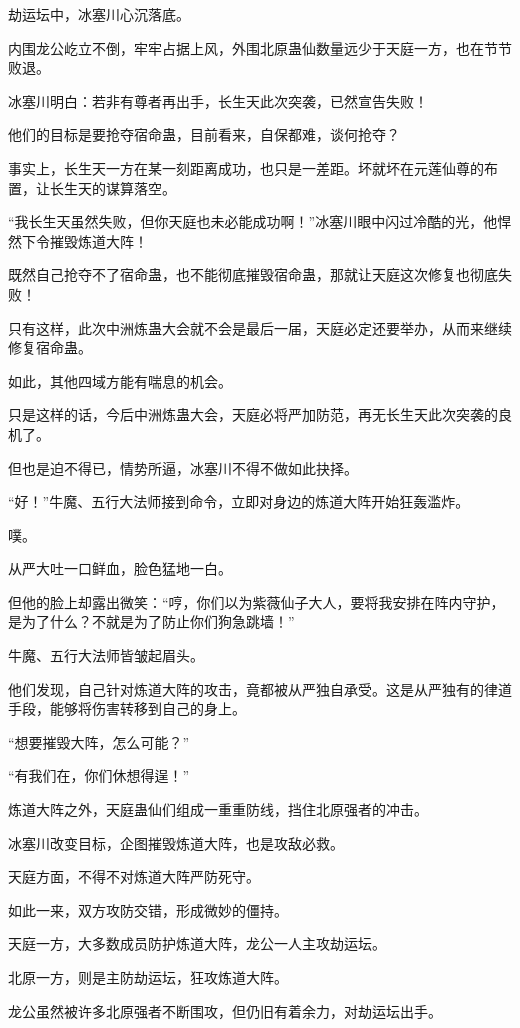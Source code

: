 \begin{this_body}
劫运坛中，冰塞川心沉落底。

内围龙公屹立不倒，牢牢占据上风，外围北原蛊仙数量远少于天庭一方，也在节节败退。

冰塞川明白：若非有尊者再出手，长生天此次突袭，已然宣告失败！

他们的目标是要抢夺宿命蛊，目前看来，自保都难，谈何抢夺？

事实上，长生天一方在某一刻距离成功，也只是一差距。坏就坏在元莲仙尊的布置，让长生天的谋算落空。

“我长生天虽然失败，但你天庭也未必能成功啊！”冰塞川眼中闪过冷酷的光，他悍然下令摧毁炼道大阵！

既然自己抢夺不了宿命蛊，也不能彻底摧毁宿命蛊，那就让天庭这次修复也彻底失败！

只有这样，此次中洲炼蛊大会就不会是最后一届，天庭必定还要举办，从而来继续修复宿命蛊。

如此，其他四域方能有喘息的机会。

只是这样的话，今后中洲炼蛊大会，天庭必将严加防范，再无长生天此次突袭的良机了。

但也是迫不得已，情势所逼，冰塞川不得不做如此抉择。

“好！”牛魔、五行大法师接到命令，立即对身边的炼道大阵开始狂轰滥炸。

噗。

从严大吐一口鲜血，脸色猛地一白。

但他的脸上却露出微笑：“哼，你们以为紫薇仙子大人，要将我安排在阵内守护，是为了什么？不就是为了防止你们狗急跳墙！”

牛魔、五行大法师皆皱起眉头。

他们发现，自己针对炼道大阵的攻击，竟都被从严独自承受。这是从严独有的律道手段，能够将伤害转移到自己的身上。

“想要摧毁大阵，怎么可能？”

“有我们在，你们休想得逞！”

炼道大阵之外，天庭蛊仙们组成一重重防线，挡住北原强者的冲击。

冰塞川改变目标，企图摧毁炼道大阵，也是攻敌必救。

天庭方面，不得不对炼道大阵严防死守。

如此一来，双方攻防交错，形成微妙的僵持。

天庭一方，大多数成员防护炼道大阵，龙公一人主攻劫运坛。

北原一方，则是主防劫运坛，狂攻炼道大阵。

龙公虽然被许多北原强者不断围攻，但仍旧有着余力，对劫运坛出手。


\end{this_body}
